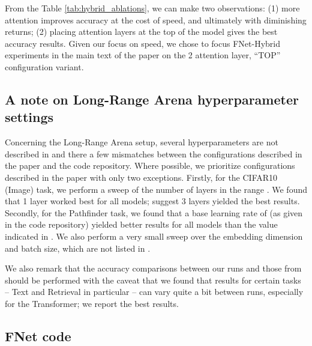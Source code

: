 \documentclass[11pt]{article}
\begin{document}
From the Table \ref{tab:hybrid_ablations}, we can make two observations: (1) more attention improves accuracy at the cost of speed, and ultimately with diminishing returns; (2) placing attention layers at the top of the model gives the best accuracy results. Given our focus on speed, we chose to focus FNet-Hybrid experiments in the main text of the paper on the 2 attention layer, ``TOP'' configuration variant.


\subsection{A note on Long-Range Arena hyperparameter settings}
\label{app:lra}

Concerning the Long-Range Arena setup, several hyperparameters are not described in \citet{tay2020long} and there a few mismatches between the configurations described in the paper and the code repository. Where possible, we prioritize configurations described in the paper with only two exceptions. Firstly, for the CIFAR10 (Image) task, we perform a sweep of the number of layers in the range . We found that 1 layer worked best for all models; \citet{tay2020long} suggest 3 layers yielded the best results. Secondly, for the Pathfinder task, we found that a base learning rate of  (as given in the code repository) yielded better results for all models than the  value indicated in \citet{tay2020long}.  We also perform a very small sweep over the embedding dimension and batch size, which are not listed in \citet{tay2020long}.

We also remark that the accuracy comparisons between our runs and those from \citet{tay2020long} should be performed with the caveat that we found that results for certain tasks -- Text and Retrieval in particular -- can vary quite a bit between runs, especially for the Transformer; we report the best results.


\subsection{FNet code}
\label{app:code}
\end{document}

